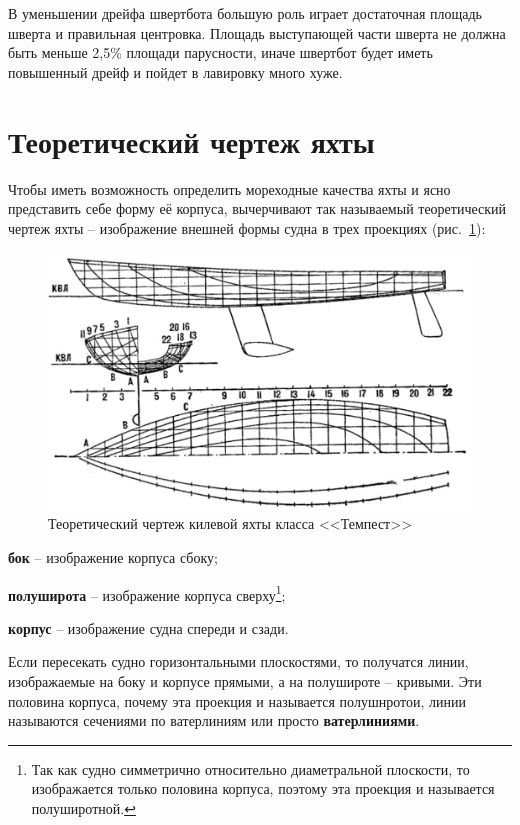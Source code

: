 \documentclass[a4paper, 12pt, twoside, final]{scrbook}
\begin{document}
В уменьшении дрейфа швертбота большую роль играет достаточная площадь шверта и правильная центровка. Площадь выступающей части шверта не должна быть меньше 2,5\% площади парусности, иначе швертбот будет иметь повышенный дрейф и пойдет в лавировку много хуже.

\section{Теоретический чертеж яхты}

Чтобы иметь возможность определить мореходные качества яхты и ясно представить себе форму её корпуса, вычерчивают так называемый теоретический чертеж яхты \--- изображение внешней формы судна в трех проекциях (рис.~\ref{fig:85}):

\begin{figure}[htbp]
   \centering
   \includegraphics{pics/85_Teor_chertezh_Tempest} %
   \caption{Теоретический чертеж килевой яхты класса <<Темпест>>}
   \label{fig:85}
\end{figure}

\textbf{бок} \--- изображение корпуса сбоку;

\textbf{полуширота} \--- изображение корпуса сверху\footnote{Так как судно симметрично относительно диаметральной плоскости, то изображается только половина корпуса, поэтому эта проекция и называется полуширотной.};

\textbf{корпус} \--- изображение судна спереди и сзади.

Если пересекать судно горизонтальными плоскостями, то получатся линии, изображаемые на боку и корпусе прямыми, а на полушироте \--- кривыми. Эти половина корпуса, почему эта проекция и называется полушнротои, линии называются сечениями по ватерлиниям или просто \textbf{ватерлиниями}.
\end{document}
